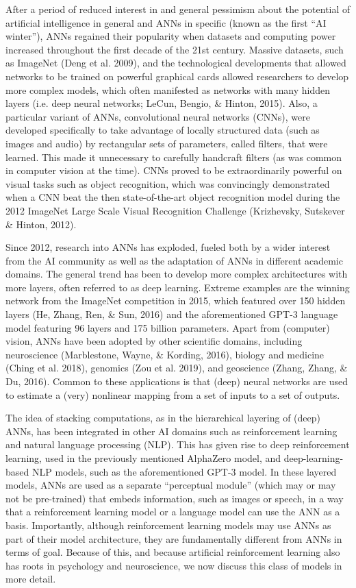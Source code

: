 After a period of reduced interest in and general pessimism about the
potential of artificial intelligence in general and ANNs in specific
(known as the first ``AI winter''), ANNs regained their popularity
when datasets and computing power increased throughout the first
decade of the 21st century.
Massive datasets, such as ImageNet (Deng et al. 2009), and the
technological developments that allowed networks to be trained on
powerful graphical cards allowed researchers to develop more complex
models, which often manifested as networks with many hidden layers
(i.e. deep neural networks; LeCun, Bengio, \& Hinton, 2015).
Also, a particular variant of ANNs, convolutional neural networks
(CNNs), were developed specifically to take advantage of locally
structured data (such as images and audio) by rectangular sets of
parameters, called filters, that were learned.
This made it unnecessary to carefully handcraft filters (as was common
in computer vision at the time).
CNNs proved to be extraordinarily powerful on visual tasks such as
object recognition, which was convincingly demonstrated when a CNN
beat the then state-of-the-art object recognition model during the
2012 ImageNet Large Scale Visual Recognition Challenge
(Krizhevsky, Sutskever \& Hinton, 2012).

Since 2012, research into ANNs has exploded, fueled both by a wider
interest from the AI community as well as the adaptation of ANNs
in different academic domains.
The general trend has been to develop more complex architectures
with more layers, often referred to as deep learning.
Extreme examples are the winning network from the ImageNet
competition in 2015, which featured over 150 hidden layers
(He, Zhang, Ren, \& Sun, 2016) and the aforementioned GPT-3 language
model featuring 96 layers and 175 billion parameters.
Apart from (computer) vision, ANNs have been adopted by other
scientific domains, including neuroscience
(Marblestone, Wayne, \& Kording, 2016), biology and medicine
(Ching et al. 2018), genomics (Zou et al. 2019), and geoscience
(Zhang, Zhang, \& Du, 2016).
Common to these applications is that (deep) neural networks are used
to estimate a (very) nonlinear mapping from a set of inputs to a set
of outputs.

The idea of stacking computations, as in the hierarchical layering
of (deep) ANNs, has been integrated in other AI domains such as
reinforcement learning and natural language processing (NLP).
This has given rise to deep reinforcement learning, used in the
previously mentioned AlphaZero model, and deep-learning-based NLP
models, such as the aforementioned GPT-3 model.
In these layered models, ANNs are used as a separate ``perceptual
module'' (which may or may not be pre-trained) that embeds information,
such as images or speech, in a way that a reinforcement learning
model or a language model can use the ANN as a basis.
Importantly, although reinforcement learning models may use ANNs
as part of their model architecture, they are fundamentally different
from ANNs in terms of goal.
Because of this, and because artificial reinforcement learning also
has roots in psychology and neuroscience, we now discuss this class
of models in more detail.

